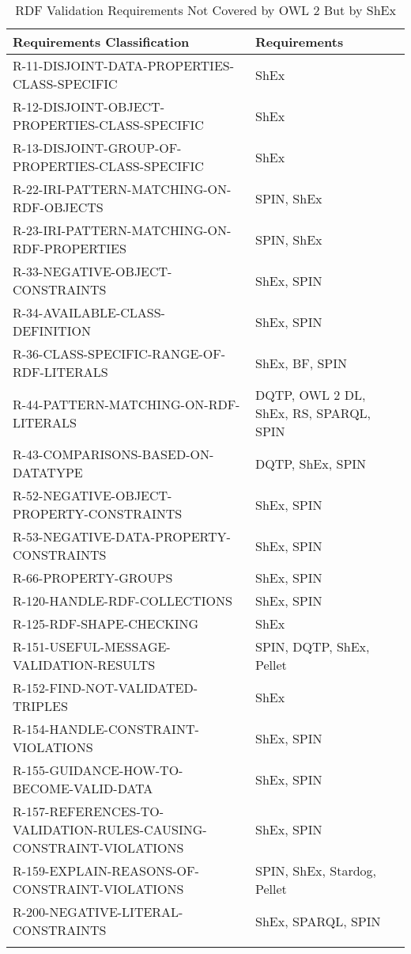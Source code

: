 \documentclass{llncs}
\newcommand{\hr}{\hline\noalign{\smallskip}} %
\begin{document}
\begin{table}
\caption{RDF Validation Requirements Not Covered by OWL 2 But by ShEx}
\label{tab:RequirementsCoveredShEx}
\centering
\begin{tabular}{ll}
\hr
Requirements Classification & Requirements \\
\hr
R-11-DISJOINT-DATA-PROPERTIES-CLASS-SPECIFIC & ShEx \\
R-12-DISJOINT-OBJECT-PROPERTIES-CLASS-SPECIFIC & ShEx \\
R-13-DISJOINT-GROUP-OF-PROPERTIES-CLASS-SPECIFIC & ShEx \\
R-22-IRI-PATTERN-MATCHING-ON-RDF-OBJECTS & SPIN, ShEx \\
R-23-IRI-PATTERN-MATCHING-ON-RDF-PROPERTIES & SPIN, ShEx \\
R-33-NEGATIVE-OBJECT-CONSTRAINTS & ShEx, SPIN \\
R-34-AVAILABLE-CLASS-DEFINITION & ShEx, SPIN \\
R-36-CLASS-SPECIFIC-RANGE-OF-RDF-LITERALS & ShEx, BF, SPIN \\
R-44-PATTERN-MATCHING-ON-RDF-LITERALS & DQTP, OWL 2 DL, ShEx, RS, SPARQL, SPIN \\
R-43-COMPARISONS-BASED-ON-DATATYPE & DQTP, ShEx, SPIN \\
R-52-NEGATIVE-OBJECT-PROPERTY-CONSTRAINTS & ShEx, SPIN \\
R-53-NEGATIVE-DATA-PROPERTY-CONSTRAINTS & ShEx, SPIN \\
R-66-PROPERTY-GROUPS & ShEx, SPIN \\
R-120-HANDLE-RDF-COLLECTIONS & ShEx, SPIN \\
R-125-RDF-SHAPE-CHECKING & ShEx \\
R-151-USEFUL-MESSAGE-VALIDATION-RESULTS & SPIN, DQTP, ShEx, Pellet \\
R-152-FIND-NOT-VALIDATED-TRIPLES & ShEx \\
R-154-HANDLE-CONSTRAINT-VIOLATIONS & ShEx, SPIN \\
R-155-GUIDANCE-HOW-TO-BECOME-VALID-DATA & ShEx, SPIN \\
R-157-REFERENCES-TO-VALIDATION-RULES-CAUSING-CONSTRAINT-VIOLATIONS & ShEx, SPIN \\
R-159-EXPLAIN-REASONS-OF-CONSTRAINT-VIOLATIONS & SPIN, ShEx, Stardog, Pellet \\
R-200-NEGATIVE-LITERAL-CONSTRAINTS & ShEx, SPARQL, SPIN \\
\hr
\end{tabular}
\end{table}
\end{document}
